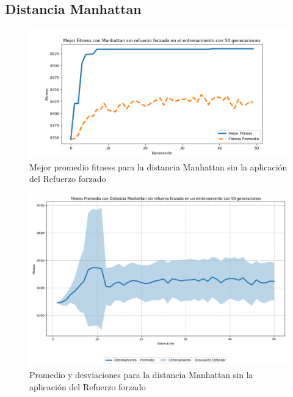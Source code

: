 \documentclass[conference]{IEEEtran}
\begin{document}
\subsection{Distancia Manhattan}
\setcounter{figure}{0}
\renewcommand{\thefigure}{S\arabic{figure}-MN}
\begin{figure}[H]
    \centering
    \includegraphics[width=0.9 \linewidth]{Sin_Refuerzo_50Gen/Manh_NoRef_50Gen.png}
    \caption{Mejor promedio fitness para la distancia Manhattan sin la aplicación del Refuerzo forzado}
    \label{fig:manh_no_ref_50}
\end{figure}
\begin{figure}[H]
    \centering
    \includegraphics[width=0.9 \linewidth]{Sin_Refuerzo_50Gen/Manh_NoRef_50Gen_Sombra.png}
    \caption{Promedio y desviaciones para la distancia Manhattan sin la aplicación del Refuerzo forzado}
    \label{fig:manh_no_ref_50_sombra}
\end{figure}
\end{document}
